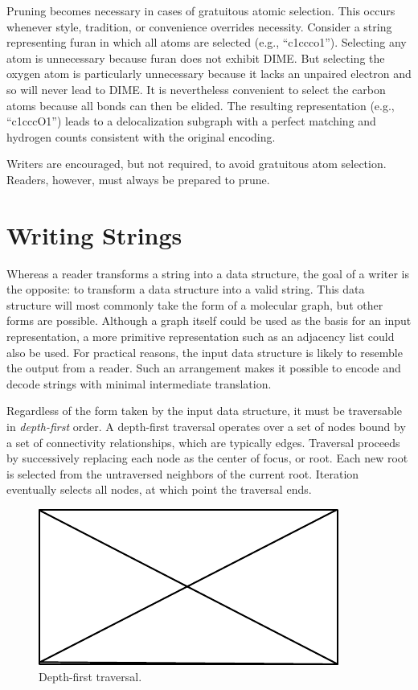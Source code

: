 \documentclass{article}
\begin{document}
Pruning becomes necessary in cases of gratuitous atomic selection. This occurs whenever style, tradition, or convenience overrides necessity. Consider a string representing furan in which all atoms are selected (e.g., \enquote{c1ccco1}). Selecting any atom is unnecessary because furan does not exhibit DIME. But selecting the oxygen atom is particularly unnecessary because it lacks an unpaired electron and so will never lead to DIME. It is nevertheless convenient to select the carbon atoms because all bonds can then be elided. The resulting representation (e.g., \enquote{c1cccO1}) leads to a delocalization subgraph with a perfect matching and hydrogen counts consistent with the original encoding.

Writers are encouraged, but not required, to avoid gratuitous atom selection. Readers, however, must always be prepared to prune.

\section*{Writing Strings}

Whereas a reader transforms a string into a data structure, the goal of a writer is the opposite: to transform a data structure into a valid string. This data structure will most commonly take the form of a molecular graph, but other forms are possible. Although a graph itself could be used as the basis for an input representation, a more primitive representation such as an adjacency list could also be used. For practical reasons, the input data structure is likely to resemble the output from a reader. Such an arrangement makes it possible to encode and decode strings with minimal intermediate translation.

Regardless of the form taken by the input data structure, it must be traversable in \textit{depth-first} order. A depth-first traversal operates over a set of nodes bound by a set of connectivity relationships, which are typically edges. Traversal proceeds by successively replacing each node as the center of focus, or root. Each new root is selected from the untraversed neighbors of the current root. Iteration eventually selects all nodes, at which point the traversal ends.

\begin{figure}
    \centering
    \includegraphics{filler}
    \caption{Depth-first traversal.}
    \label{fig:depth-first-traversal}
\end{figure}
\end{document}
